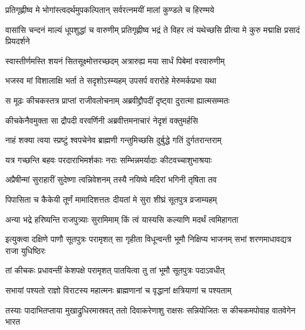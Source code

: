 \twolineshloka
{प्रतिगृह्णीष्व मे भोगांस्त्वदर्थमुपकल्पितान्}
{सर्वरत्नमयीं मालां कुण्डले च हिरण्मये}





\threelineshloka
{वासांसि चन्दनं माल्यं धूपशुद्धां च वारुणीम्}
{प्रतिगृह्णीष्व भद्रं ते विहर त्वं यथेच्छसि}
{प्रीत्या मे कुरु मद्माक्षि प्रसादं प्रियदर्शने}


\twolineshloka
{स्वास्तीर्णमस्ति शयनं सितसूक्ष्मोत्तरच्छदम्}
{अत्रारुह्य मया सार्धं पिबेमां वरवारुणीम्}


\twolineshloka
{भजस्व मां विशालाक्षि भर्ता ते सदृशोऽस्म्यहम्}
{उपसर्प वरारोहे मेरुमर्कप्रभा यथा}



\twolineshloka
{स मूढः कीचकस्तत्र प्राप्तां राजीवलोचनाम्}
{अब्रवीद्द्रौपदीं दृष्ट्वा दुरात्मा ह्यात्मसम्मतः}


\twolineshloka
{कीचकेनैवमुक्ता सा द्रौपदी वरवर्णिनी}
{अब्रवीत्तमनाचारं नेदृशं वक्तुमर्हसि}


\twolineshloka
{नाहं शक्या त्वया स्प्रष्टुं श्वपचेनेव ब्राह्मणी}
{गन्तुमिच्छसि दुर्बुद्धे गतिं दुर्गतरान्तराम्}


\twolineshloka
{यत्र गच्छन्ति बहवः परदाराभिमर्शकाः}
{नराः सम्भिन्नमर्यादाः कीटवच्चाशुभाश्रयाः}


\twolineshloka
{अप्रैषीन्मां सुराहारीं सुदेष्णा त्वन्निवेशनम्}
{तस्यै नयिष्ये मदिरां भगिनी तृषिता तव}


\twolineshloka
{पिपासिता च कैकेयी तूर्णं मामादिशत्ततः}
{दीयतां मे सुरा शीघ्रं सूतपुत्र व्रजाम्यहम्}




\twolineshloka
{अन्या भद्रे हरिष्यन्ति राजपुत्र्याः सुरामिमाम्}
{किं त्वं यास्यसि कल्याणि मदर्थं त्वमिहागता}



\threelineshloka
{इत्युक्त्वा दक्षिणे पाणौ सूतपुत्रः परामृशत्}
{सा गृहीता विधून्वन्ती भूमौ निक्षिप्य भाजनम्}
{सभां शरणमाधावद्यत्र राजा युधिष्ठिरः}


\twolineshloka
{तां कीचकः प्रधावन्तीं केशपक्षे परामृशत्}
{पातयित्वा तु तां भूमौ सूतपुत्रः पदाऽवधीत्}


\twolineshloka
{सभायां पश्यतो राज्ञो विराटस्य महात्मनः}
{ब्राह्मणानां च वृद्धानां क्षत्रियाणां च पश्यताम्}


\onelineshloka
{तस्याः पादाभितप्ताया मुखाद्रुधिरमास्रवत्}
\twolineshloka
{ततो दिवाकरेणाशु राक्षसः सन्नियोजितः}
{स कीचकमपोवाह वातवेगेन भारत}



